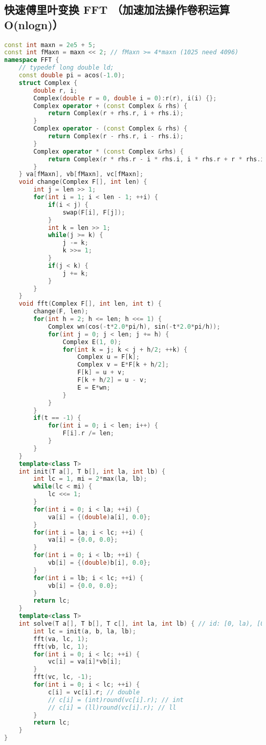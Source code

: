 \subsection{快速傅里叶变换 FFT （加速加法操作卷积运算 O(nlogn)）}

\begin{lstlisting}[language=C++]
const int maxn = 2e5 + 5;
const int fMaxn = maxn << 2; // fMaxn >= 4*maxn (1025 need 4096)
namespace FFT {
    // typedef long double ld;
    const double pi = acos(-1.0);
    struct Complex {
        double r, i;
        Complex(double r = 0, double i = 0):r(r), i(i) {};
        Complex operator + (const Complex & rhs) {
            return Complex(r + rhs.r, i + rhs.i);
        }
        Complex operator - (const Complex & rhs) {
            return Complex(r - rhs.r, i - rhs.i);
        }
        Complex operator * (const Complex &rhs) {
            return Complex(r * rhs.r - i * rhs.i, i * rhs.r + r * rhs.i);
        }
    } va[fMaxn], vb[fMaxn], vc[fMaxn];
    void change(Complex F[], int len) {
        int j = len >> 1;
        for(int i = 1; i < len - 1; ++i) {
            if(i < j) {
                swap(F[i], F[j]);
            }
            int k = len >> 1;
            while(j >= k) {
                j -= k;
                k >>= 1;
            }
            if(j < k) {
                j += k;
            }
        }
    }
    void fft(Complex F[], int len, int t) {
        change(F, len);
        for(int h = 2; h <= len; h <<= 1) {
            Complex wn(cos(-t*2.0*pi/h), sin(-t*2.0*pi/h));
            for(int j = 0; j < len; j += h) {
                Complex E(1, 0);
                for(int k = j; k < j + h/2; ++k) {
                    Complex u = F[k];
                    Complex v = E*F[k + h/2];
                    F[k] = u + v;
                    F[k + h/2] = u - v;
                    E = E*wn;
                }
            }
        }
        if(t == -1) {
            for(int i = 0; i < len; i++) {
                F[i].r /= len;
            }
        }
    }
    template<class T>
    int init(T a[], T b[], int la, int lb) {
        int lc = 1, mi = 2*max(la, lb);
        while(lc < mi) {
            lc <<= 1;
        }
        for(int i = 0; i < la; ++i) {
            va[i] = {(double)a[i], 0.0};
        }
        for(int i = la; i < lc; ++i) {
            va[i] = {0.0, 0.0};
        }
        for(int i = 0; i < lb; ++i) {
            vb[i] = {(double)b[i], 0.0};
        }
        for(int i = lb; i < lc; ++i) {
            vb[i] = {0.0, 0.0};
        }
        return lc;
    }
    template<class T>
    int solve(T a[], T b[], T c[], int la, int lb) { // id: [0, la), [0, lb), [0, lc)
        int lc = init(a, b, la, lb);
        fft(va, lc, 1);
        fft(vb, lc, 1);
        for(int i = 0; i < lc; ++i) {
            vc[i] = va[i]*vb[i];
        }
        fft(vc, lc, -1);
        for(int i = 0; i < lc; ++i) {
            c[i] = vc[i].r; // double
            // c[i] = (int)round(vc[i].r); // int
            // c[i] = (ll)round(vc[i].r); // ll
        }
        return lc;
    }
}
\end{lstlisting}

